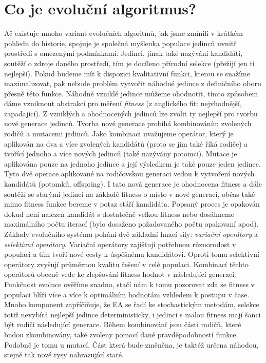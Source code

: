 \section{Co je evoluční algoritmus?}
Ač existuje mnoho variant evolučních algoritmů, jak jsme zmínili v krátkém pohledu do historie, spojuje je společná myšlenka populace jedinců uvnitř prostředí s omezenými podmínkami. Jedinci, jinak také nazývání kandidáti, soutěží o zdroje daného prostředí, tím je docíleno přírodní selekce (přežijí jen ti nejlepší). Pokud budeme mít k dispozici kvalitativní funkci, kterou se snažíme maximalizovat, pak nebude problém vytvořit náhodné jedince z definičního oboru přesně této funkce. Náhodně vzniklé jedince můžeme ohodnotit, tímto způsobem dáme vzniknout abstrakci pro měření \textit{fitness} (z anglického fit: nejvhodnější, zapadající). Z vzniklých a ohodnocených jedinců lze zvolit ty nejlepší pro tvorbu nové generace jedinců. Tvorba nové generace probíhá kombinováním zvolených rodičů a mutacemi jedinců. Jako kombinaci uvažujeme operátor, který je aplikován na dva a více zvolených kandidátů (proto se jim také říká rodiče) a tvořící jednoho a více nových jedinců (také nazývány potomci). Mutace je aplikována pouze na jednoho jedince a její výsledkem je také pouze jeden jedinec. Tyto dvě operace aplikované na rodičovskou generaci vedou k vytvoření nových kandidátů (potomků, offspring). I tato nová generace je ohodnocena fitness a dále soutěží se starými jedinci na základě fitness o místo v nové generaci, občas také mimo fitness funkce bereme v potaz stáří kandidáta. Popsaný proces je opakován dokud není nalezen kandidát s dostatečně velkou fitness nebo dosáhneme maximálního počtu iterací (bylo dosaženo požadovaného počtu opakovaní apod). Základy evolučního systému pohání dvě základní hnací síly: \textit{variační operátory} a \textit{selektivní operátory}. Variační operátory zajišťují potřebnou různorodost v populaci a tím tvoří nové cesty k úspěšnému kandidátovi. Oproti tomu selektivní operátory zvyšují průměrnou kvalitu řešení v celé populaci. Kombinací těchto operátorů obecně vede ke zlepšování fitness hodnot v následující generaci. Funkčnost evoluce ověříme snadno, stačí nám k tomu pozorovat zda se fitness v populaci blíží více a více k optimálním hodnotám vzhledem k postupu v čase. Mnoho komponent zapříčiňuje, že EA se řadí ke stochastickým metodám, selekce totiž nevybírá nejlepší jedince deterministicky, i jedinci s malou fitness mají šanci být rodiči následující generace. Během kombinování jsou části rodičů, které budou zkombinovány, také zvoleny pomocí dané pravděpodobností funkce. Podobně je tomu u mutací. Část která bude změněna, je taktéž určena náhodou, stejně tak nové rysy nahrazující staré.  

